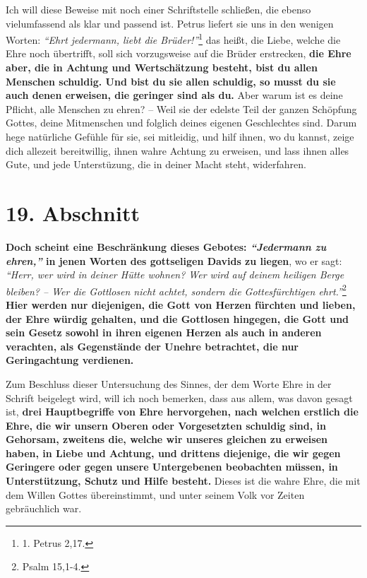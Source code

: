 Ich will diese Beweise mit noch einer Schriftstelle schließen, die ebenso
vielumfassend als klar und passend ist. Petrus liefert sie uns in den
wenigen Worten:
\textit{"`Ehrt jedermann, liebt die Brüder!"'}\footnote{1. Petrus 2,17.}
das heißt, die Liebe, welche die Ehre noch übertrifft, soll sich vorzugsweise
auf die
Brüder erstrecken, \label{ref:09_18_ehre}
\textbf{die Ehre aber, die in Achtung und Wertschätzung besteht,
bist du allen Menschen schuldig. Und bist du sie allen schuldig, so musst du sie
auch denen erweisen, die geringer sind als du. } Aber warum
ist es deine Pflicht,
alle Menschen zu ehren? -- Weil sie der edelste Teil der ganzen Schöpfung
Gottes, deine Mitmenschen und folglich deines eigenen Geschlechtes sind. Darum
hege natürliche Gefühle für sie, sei mitleidig, und hilf ihnen, wo du kannst,
zeige dich allezeit bereitwillig, ihnen wahre Achtung zu erweisen, und lass
ihnen
alles Gute, und jede Unterstüzung, die in deiner Macht steht, widerfahren.

\section{19. Abschnitt} \label{kap9_ab19}

 \label{ref:09_19_ehre}
\textbf{Doch scheint eine Beschränkung dieses Gebotes:
\textit{"`Jedermann zu ehren,"'} in jenen
Worten des gottseligen Davids zu liegen}, wo er sagt:
\textit{"`Herr, wer wird
in deiner Hütte wohnen? Wer wird auf deinem heiligen Berge bleiben? -- Wer die
Gottlosen nicht achtet, sondern die Gottesfürchtigen ehrt."'}\footnote{Psalm
15,1-4.}
\textbf{Hier werden nur diejenigen, die Gott von Herzen fürchten und lieben, der
Ehre würdig gehalten, und die Gottlosen
hingegen,
die Gott und sein Gesetz
sowohl in ihren eigenen Herzen als auch in anderen verachten, als Gegenstände
der
Unehre betrachtet, die nur Geringachtung verdienen.}

\medskip

Zum Beschluss dieser Untersuchung des Sinnes, der dem Worte Ehre in der Schrift
beigelegt wird, will ich noch bemerken, dass aus allem, was davon gesagt ist,
\textbf{drei Hauptbegriffe von Ehre hervorgehen, nach welchen erstlich die Ehre,
die wir
unsern Oberen oder Vorgesetzten schuldig sind, in Gehorsam, zweitens die, welche
wir unseres gleichen zu erweisen haben, in Liebe und Achtung, und drittens
diejenige, die wir gegen Geringere oder gegen unsere Untergebenen beobachten
müssen, in Unterstützung, Schutz und Hilfe besteht.} Dieses ist die wahre Ehre,
die mit dem Willen Gottes übereinstimmt, und unter seinem Volk vor Zeiten
gebräuchlich war.

